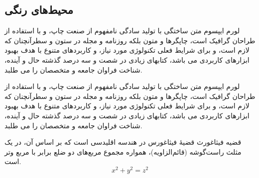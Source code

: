 \documentclass[
]{article}
\newenvironment{rmdThink}{
	\vspace*{0.5\baselineskip}
    \par\noindent
    \begin{tcolorbox}[enhanced, title={\large{\color{white}بیشتر بدانیم }},colback=MPIGreen!10!white, colframe=MPIGreen]
    \itshape
}{
    \end{tcolorbox}
    \par\ignorespacesafterend
}
\begin{document}
\hypertarget{ux645ux62dux6ccux637ux647ux627ux6cc-ux631ux646ux6afux6cc}{%
\subsection{محیط‌های
رنگی}\label{ux645ux62dux6ccux637ux647ux627ux6cc-ux631ux646ux6afux6cc}}

\begin{rmdThink}
لورم ایپسوم متن ساختگی با تولید سادگی نامفهوم از صنعت چاپ، و با استفاده
از طراحان گرافیک است، چاپگرها و متون بلکه روزنامه و مجله در ستون و
سطرآنچنان که لازم است، و برای شرایط فعلی تکنولوژی مورد نیاز، و کاربردهای
متنوع با هدف بهبود ابزارهای کاربردی می باشد، کتابهای زیادی در شصت و سه
درصد گذشته حال و آینده، شناخت فراوان جامعه و متخصصان را می طلبد.

\end{rmdThink}

\begin{rmdthink}
لورم ایپسوم متن ساختگی با تولید سادگی نامفهوم از صنعت چاپ، و با استفاده
از طراحان گرافیک است، چاپگرها و متون بلکه روزنامه و مجله در ستون و
سطرآنچنان که لازم است، و برای شرایط فعلی تکنولوژی مورد نیاز، و کاربردهای
متنوع با هدف بهبود ابزارهای کاربردی می باشد، کتابهای زیادی در شصت و سه
درصد گذشته حال و آینده، شناخت فراوان جامعه و متخصصان را می طلبد.

\end{rmdthink}

\begin{Theorem}{قضیه فیثاغورث}
قضیهٔ فیثاغورس در هندسه اقلیدسی است که بر اساس آن، در یک مثلث راست‌گوشه
(قائم‌الزاویه)، همواره مجموع مربع‌های دو ضلع برابر با مربع وتر است.
\[x^2 + y^2 = z^2\]

\end{Theorem}
\end{document}
